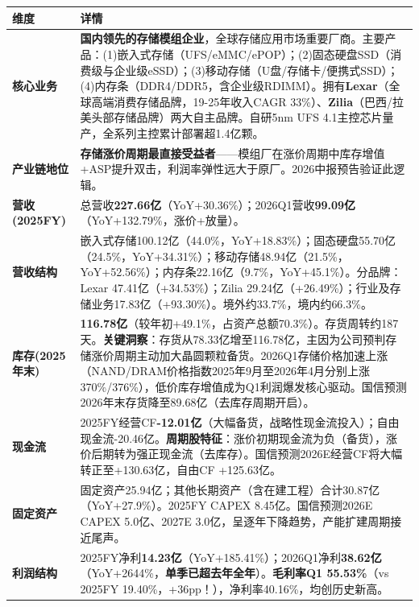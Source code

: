 \begin{exhibitbox}
\centering
\scriptsize
\renewcommand{\arraystretch}{1.20}
\begin{tabularx}{\exhibitboxwidth}{>{\bfseries}p{2.2cm} >{\raggedright\arraybackslash\sloppy\hspace{0pt}}X}
\toprule
\textbf{维度} & \textbf{详情} \\
\midrule
核心业务 & \textbf{国内领先的存储模组企业}，全球存储应用市场重要厂商。主要产品：(1)嵌入式存储（UFS/eMMC/ePOP）；(2)固态硬盘SSD（消费级与企业级eSSD）；(3)移动存储（U盘/存储卡/便携式SSD）；(4)内存条（DDR4/DDR5，含企业级RDIMM）。拥有\textbf{Lexar}（全球高端消费存储品牌，19-25年收入CAGR 33\%）、\textbf{Zilia}（巴西/拉美头部存储品牌）两大自主品牌。自研5nm UFS 4.1主控芯片量产，全系列主控累计部署超1.4亿颗。 \\
产业链地位 & \textbf{存储涨价周期最直接受益者}——模组厂在涨价周期中库存增值+ASP提升双击，利润率弹性远大于原厂。2026中报预告验证此逻辑。 \\
营收(2025FY) & 总营收\textbf{227.66亿}（YoY+30.36\%）；2026Q1营收\textbf{99.09亿}（YoY+132.79\%，涨价+放量）。 \\
营收结构 & 嵌入式存储100.12亿（44.0\%，YoY+18.83\%）；固态硬盘55.70亿（24.5\%，YoY+34.31\%）；移动存储48.94亿（21.5\%，YoY+52.56\%）；内存条22.16亿（9.7\%，YoY+45.1\%）。分品牌：Lexar 47.41亿（+34.53\%）；Zilia 29.24亿（+26.49\%）；行业及存储业务17.83亿（+93.30\%）。境外约33.7\%，境内约66.3\%。 \\
库存(2025年末) & \textbf{116.78亿}（较年初+49.1\%，占资产总额70.3\%）。存货周转约187天。\textbf{关键洞察}：存货从78.33亿增至116.78亿，主因为公司预判存储涨价周期主动加大晶圆颗粒备货。2026Q1存储价格加速上涨（NAND/DRAM价格指数2025年9月至2026年4月分别上涨370\%/376\%），低价库存增值成为Q1利润爆发核心驱动。国信预测2026年末存货降至89.68亿（去库存周期开启）。 \\
现金流 & 2025FY经营CF\textbf{-12.01亿}（大幅备货，战略性现金流投入）；自由现金流-20.46亿。\textbf{周期股特征}：涨价初期现金流为负（备货），涨价后期转为强正现金流（去库存）。国信预测2026E经营CF将大幅转正至+130.63亿，自由CF +125.63亿。 \\
固定资产 & 固定资产25.94亿；其他长期资产（含在建工程）合计30.87亿（YoY+27.9\%）。2025FY CAPEX 8.45亿。国信预测2026E CAPEX 5.0亿、2027E 3.0亿，呈逐年下降趋势，产能扩建周期接近尾声。 \\
利润结构 & 2025FY净利\textbf{14.23亿}（YoY+185.41\%）；2026Q1净利\textbf{38.62亿}（YoY+2644\%，\textbf{单季已超去年全年}）。\textbf{毛利率Q1 55.53\%}（vs 2025FY 19.40\%，+36pp！），净利率40.16\%，均创历史新高。 \\

\end{tabularx}
\end{exhibitbox}
